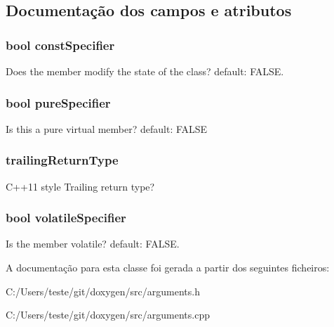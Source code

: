 \subsection{Documentação dos campos e atributos}
\hypertarget{class_argument_list_a9ab1475bcbf4f17b50c7b5a3110743db}{
\subsubsection[{const\-Specifier}]{\setlength{\rightskip}{0pt plus 5cm}bool const\-Specifier}}\label{class_argument_list_a9ab1475bcbf4f17b50c7b5a3110743db}
Does the member modify the state of the class? default\-: F\-A\-L\-S\-E. \hypertarget{class_argument_list_a7606644da45fc7bbd695bad212ede6af}{
\subsubsection[{pure\-Specifier}]{\setlength{\rightskip}{0pt plus 5cm}bool pure\-Specifier}}\label{class_argument_list_a7606644da45fc7bbd695bad212ede6af}
Is this a pure virtual member? default\-: F\-A\-L\-S\-E \hypertarget{class_argument_list_ac2cd23d5da83b9f380f0e0a69bcace02}{
\subsubsection[{trailing\-Return\-Type}]{ trailing\-Return\-Type}}\label{class_argument_list_ac2cd23d5da83b9f380f0e0a69bcace02}
C++11 style Trailing return type? \hypertarget{class_argument_list_a7d6765f3c1ff9ee13a05a1eabbefc965}{
\subsubsection[{volatile\-Specifier}]{\setlength{\rightskip}{0pt plus 5cm}bool volatile\-Specifier}}\label{class_argument_list_a7d6765f3c1ff9ee13a05a1eabbefc965}
Is the member volatile? default\-: F\-A\-L\-S\-E. 

A documentação para esta classe foi gerada a partir dos seguintes ficheiros\-:\begin{DoxyCompactItemize}
\item 
C\-:/\-Users/teste/git/doxygen/src/arguments.\-h\item 
C\-:/\-Users/teste/git/doxygen/src/arguments.\-cpp\end{DoxyCompactItemize}
